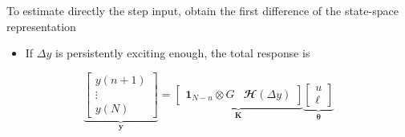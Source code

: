 \documentclass[presentation]{beamer}
\begin{document}
\begin{frame}[label={slide:preliminaries6}]{To estimate directly the step input,  obtain \linebreak the first difference of the state-space representation}
\begin{itemize}
\item If $\Delta {y}$ is persistently exciting enough, the total response is  
\end{itemize}
\begin{equation*} \underbrace{ \begin{bmatrix} y(n+1) \\ \vdots \\ y(N) \end{bmatrix}}_{\mathbf{y}} = \underbrace{ \begin{bmatrix} \mathbf{1}_{N-n} \otimes G & \mathbfcal{H}\left(\Delta {y}\right) \end{bmatrix}}_{\mathbf{K}} \underbrace{ \begin{bmatrix} u \\ \bm{\ell} \end{bmatrix} }_{\bm{\theta}} \end{equation*}
\end{frame}
\end{document}
